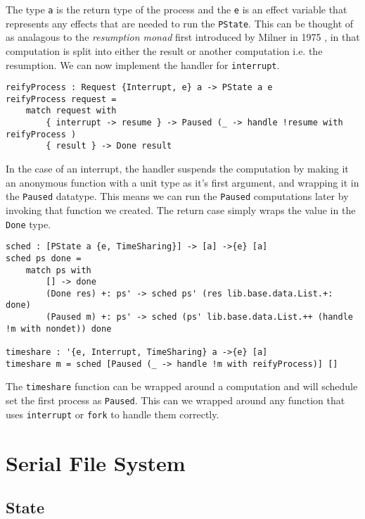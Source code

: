 \documentclass[logo,bsc,singlespacing,parskip]{infthesis}
\begin{document}
The type \texttt{a} is the return type of the process and the \texttt{e} is an
effect variable that represents any effects that are needed to run the
\texttt{PState}. This can be thought of as analagous to the \emph{resumption
monad} first introduced by Milner in 1975 \cite{MILNER1975157}, in that
computation is split into either the result or another computation i.e. the
resumption. We can now implement the handler for \texttt{interrupt}.

\begin{lstlisting}[language=unison]
reifyProcess : Request {Interrupt, e} a -> PState a e
reifyProcess request =
    match request with
        { interrupt -> resume } -> Paused (_ -> handle !resume with reifyProcess )
        { result } -> Done result
\end{lstlisting}

In the case of an interrupt, the handler suspends the computation by making it
an anonymous function with a unit type as it's first argument, and wrapping it
in the \texttt{Paused} datatype. This means we can run the \texttt{Paused}
computations later by invoking that function we created. The return case simply
wraps the value in the \texttt{Done} type. 

\begin{lstlisting}[language=unison]
sched : [PState a {e, TimeSharing}] -> [a] ->{e} [a]
sched ps done = 
    match ps with
        [] -> done
        (Done res) +: ps' -> sched ps' (res lib.base.data.List.+: done)
        (Paused m) +: ps' -> sched (ps' lib.base.data.List.++ (handle !m with nondet)) done

timeshare : '{e, Interrupt, TimeSharing} a ->{e} [a]
timeshare m = sched [Paused (_ -> handle !m with reifyProcess)] []
\end{lstlisting}

The \texttt{timeshare} function can be wrapped around a computation and will
schedule set the first process as \texttt{Paused}. This can we wrapped around
any function that uses \texttt{interrupt} or \texttt{fork} to handle them
correctly.

\section{Serial File System}
\label{sec:filesystem}

\subsection{State}
\end{document}
